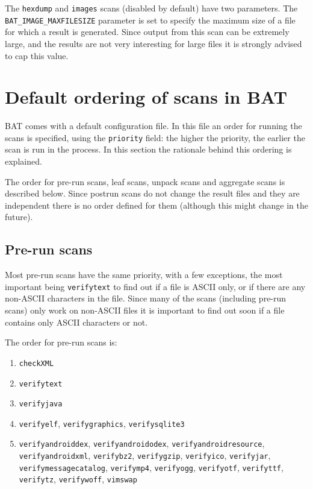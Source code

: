 \documentclass[10pt]{article}
\begin{document}
The \texttt{hexdump} and \texttt{images} scans (disabled by default) have two
parameters. The \texttt{BAT\_IMAGE\_MAXFILESIZE} parameter is set to specify
the maximum size of a file for which a result is generated. Since output from
this scan can be extremely large, and the results are not very interesting for
large files it is strongly advised to cap this value.

\section{Default ordering of scans in BAT}

BAT comes with a default configuration file. In this file an order for running
the scans is specified, using the \texttt{priority} field: the higher the
priority, the earlier the scan is run in the process. In this section the
rationale behind this ordering is explained.

The order for pre-run scans, leaf scans, unpack scans and aggregate scans is
described below. Since postrun scans do not change the result files and they are
independent there is no order defined for them (although this might change in
the future).

\subsection{Pre-run scans}

Most pre-run scans have the same priority, with a few exceptions, the most
important being \texttt{verifytext} to find out if a file is ASCII only, or if
there are any non-ASCII characters in the file. Since many of the scans
(including pre-run scans) only work on non-ASCII files it is important to find
out soon if a file contains only ASCII characters or not.

The order for pre-run scans is:

\begin{enumerate}
\item \texttt{checkXML}
\item \texttt{verifytext}
\item \texttt{verifyjava}
\item \texttt{verifyelf}, \texttt{verifygraphics}, \texttt{verifysqlite3}
\item \texttt{verifyandroiddex}, \texttt{verifyandroidodex},
\texttt{verifyandroidresource}, \texttt{verifyandroidxml}, \texttt{verifybz2},
\texttt{verifygzip}, \texttt{verifyico}, \texttt{verifyjar},
\texttt{verifymessagecatalog}, \texttt{verifymp4}, \texttt{verifyogg},
\texttt{verifyotf}, \texttt{verifyttf}, \texttt{verifytz}, \texttt{verifywoff},
\texttt{vimswap}
\end{enumerate}
\end{document}
